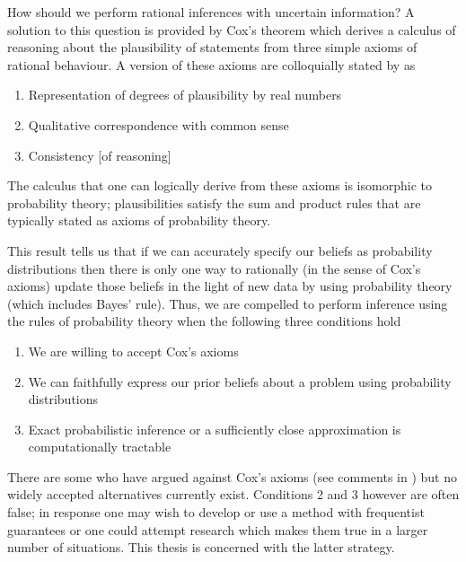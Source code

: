 How should we perform rational inferences with uncertain information?
A solution to this question is provided by Cox's theorem \citep{Cox1946-qc} which derives a calculus of reasoning about the plausibility of statements from three simple axioms of rational behaviour.
A version of these axioms are colloquially stated by \citet{Jaynes2003-jh} as
\begin{enumerate}
  \item Representation of degrees of plausibility by real numbers
  \item Qualitative correspondence with common sense
  \item Consistency [of reasoning]
\end{enumerate}
The calculus that one can logically derive from these axioms is isomorphic to probability theory; plausibilities satisfy the sum and product rules that are typically stated as axioms of probability theory.

This result tells us that if we can accurately specify our beliefs as probability distributions then there is only one way to rationally (in the sense of Cox's axioms) update those beliefs in the light of new data \ie by using probability theory (which includes Bayes' rule).
Thus, we are compelled to perform inference using the rules of probability theory when the following three conditions hold
\begin{enumerate}
  \item We are willing to accept Cox's axioms
  \item We can faithfully express our prior beliefs about a problem using probability distributions
  \item Exact probabilistic inference or a sufficiently close approximation is computationally tractable
\end{enumerate}
There are some who have argued against Cox's axioms (see comments in \citet{Jaynes2003-jh}) but no widely accepted alternatives currently exist.
Conditions 2 and 3 however are often false; in response one may wish to develop or use a method with frequentist guarantees or one could attempt research which makes them true in a larger number of situations\footnotemark{}.
This thesis is concerned with the latter strategy.


